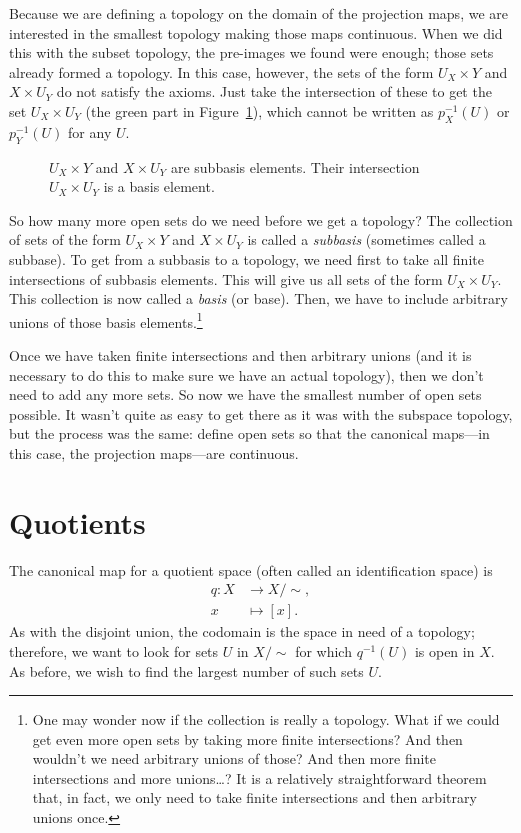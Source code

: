 \documentclass[12pt]{article}
\begin{document}
Because we are defining a topology on the domain of the projection maps, we are interested in the smallest topology making those maps continuous. When we did this with the subset topology, the pre-images we found were enough; those sets already formed a topology. In this case, however, the sets of the form $U_{X} \times Y$ and $X \times U_{Y}$ do not satisfy the axioms. Just take the intersection of these to get the set $U_{X} \times U_{Y}$ (the green part in Figure~\ref{F:product}), which cannot be written as $p_{X}^{-1}(U)$ or $p_{Y}^{-1}(U)$ for any $U$.

\begin{figure}[ht]
\centering

\caption{$U_{X} \times Y$ and $X \times U_{Y}$ are subbasis elements. Their intersection $U_{X} \times U_{Y}$ is a basis element.}
\label{F:product}
\end{figure}

So how many more open sets do we need before we get a topology? The collection of sets of the form $U_{X} \times Y$ and $X \times U_{Y}$ is called a \emph{subbasis} (sometimes called a subbase). To get from a subbasis to a topology, we need first to take all finite intersections of subbasis elements. This will give us all sets of the form $U_{X} \times U_{Y}$. This collection is now called a \emph{basis} (or base). Then, we have to include arbitrary unions of those basis elements.\footnote{One may wonder now if the collection is really a topology. What if we could get even more open sets by taking more finite intersections? And then wouldn't we need arbitrary unions of those? And then more finite intersections and more unions\dots? It is a relatively straightforward theorem that, in fact, we only need to take finite intersections and then arbitrary unions once.}

Once we have taken finite intersections and then arbitrary unions (and it is necessary to do this to make sure we have an actual topology), then we don't need to add any more sets. So now we have the smallest number of open sets possible. It wasn't quite as easy to get there as it was with the subspace topology, but the process was the same: define open sets so that the canonical maps---in this case, the projection maps---are continuous.

\section{Quotients}

The canonical map for a quotient space (often called an identification space) is
\begin{align*}
	q: X &\to X/\!\sim,	\\
       x &\mapsto [x].
\end{align*}
As with the disjoint union, the codomain is the space in need of a topology; therefore, we want to look for sets $U$ in $X/\!\sim$ for which $q^{-1}(U)$ is open in $X$. As before, we wish to find the largest number of such sets $U$.
\end{document}
